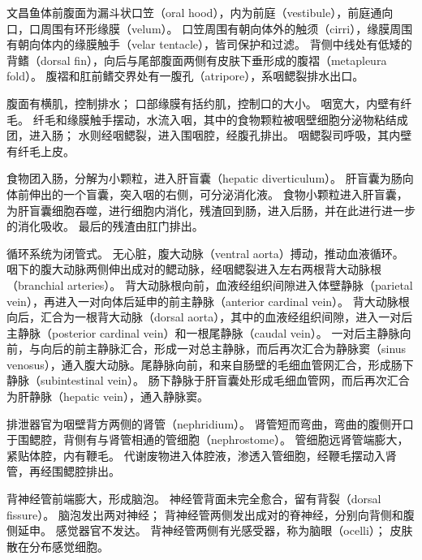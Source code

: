 \documentclass[11pt]{article}
\begin{document}
\newline

文昌鱼体前腹面为漏斗状口笠（oral hood），内为前庭（vestibule），前庭通向口，口周围有环形缘膜（velum）。
口笠周围有朝向体外的触须（cirri），缘膜周围有朝向体内的缘膜触手（velar tentacle），皆司保护和过滤。
背侧中线处有低矮的背鳍（dorsal fin），向后与尾部腹面两侧有皮肤下垂形成的腹褶（metapleura fold）。
腹褶和肛前鳍交界处有一腹孔（atripore），系咽鳃裂排水出口。

\newline

腹面有横肌，控制排水；
口部缘膜有括约肌，控制口的大小。
咽宽大，内壁有纤毛。
纤毛和缘膜触手摆动，水流入咽，其中的食物颗粒被咽壁细胞分泌物粘结成团，进入肠；
水则经咽鳃裂，进入围咽腔，经腹孔排出。
咽鳃裂司呼吸，其内壁有纤毛上皮。

\newline

食物团入肠，分解为小颗粒，进入肝盲囊（hepatic diverticulum）。
肝盲囊为肠向体前伸出的一个盲囊，突入咽的右侧，可分泌消化液。
食物小颗粒进入肝盲囊，为肝盲囊细胞吞噬，进行细胞内消化，残渣回到肠，进入后肠，并在此进行进一步的消化吸收。
最后的残渣由肛门排出。

\newline

循环系统为闭管式。
无心脏，腹大动脉（ventral aorta）搏动，推动血液循环。
咽下的腹大动脉两侧伸出成对的鳃动脉，经咽鳃裂进入左右两根背大动脉根（branchial arteries）。
背大动脉根向前，血液经组织间隙进入体壁静脉（parietal vein），再进入一对向体后延申的前主静脉（anterior cardinal vein）。
背大动脉根向后，汇合为一根背大动脉（dorsal aorta），其中的血液经组织间隙，进入一对后主静脉（posterior cardinal vein）和一根尾静脉（caudal vein）。
一对后主静脉向前，与向后的前主静脉汇合，形成一对总主静脉，而后再次汇合为静脉窦（sinus venosus），通入腹大动脉。尾静脉向前，和来自肠壁的毛细血管网汇合，形成肠下静脉（subintestinal vein）。
肠下静脉于肝盲囊处形成毛细血管网，而后再次汇合为肝静脉（hepatic vein），通入静脉窦。

\newline

排泄器官为咽壁背方两侧的肾管（nephridium）。
肾管短而弯曲，弯曲的腹侧开口于围鳃腔，背侧有与肾管相通的管细胞（nephrostome）。
管细胞远肾管端膨大，紧贴体腔，内有鞭毛。
代谢废物进入体腔液，渗透入管细胞，经鞭毛摆动入肾管，再经围鳃腔排出。

\newline

背神经管前端膨大，形成脑泡。
神经管背面未完全愈合，留有背裂（dorsal fissure）。
脑泡发出两对神经；
背神经管两侧发出成对的脊神经，分别向背侧和腹侧延申。
感觉器官不发达。
背神经管两侧有光感受器，称为脑眼（ocelli）；
皮肤散在分布感觉细胞。
\end{document}
